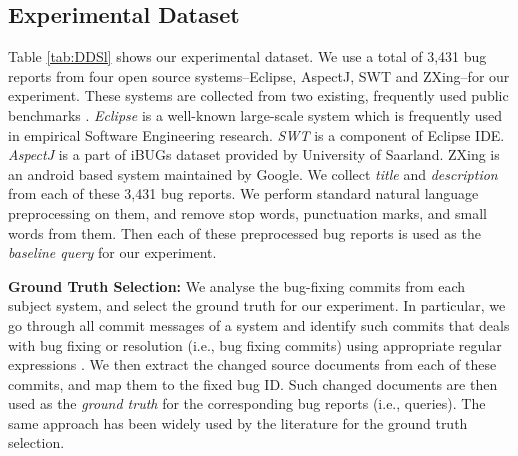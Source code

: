 \documentclass[sigconf,review,anonymous]{acmart}
\begin{document}
\subsection{Experimental Dataset}\label{sec:dataset}
Table \ref{tab:DDSl} shows our experimental dataset. We use a total of 3,431 bug reports from four open source systems--Eclipse, AspectJ, SWT and ZXing--for our experiment. These systems are collected from two existing, frequently used public benchmarks \cite{Jian,Saha}. 
\emph{Eclipse} is a well-known large-scale system which is frequently used in empirical Software Engineering research.
\emph{SWT} is a component of Eclipse IDE.
\emph{AspectJ} is a part of iBUGs dataset provided by University of Saarland. 
ZXing is an android based system maintained by Google. We collect \emph{title} and \emph{description} from each of these 3,431 bug reports. We perform standard natural language preprocessing on them, and remove stop words, punctuation marks, and small words from them. Then each of these preprocessed bug reports is used as the \emph{baseline query} for our experiment. 



\textbf{Ground Truth Selection:} We analyse the bug-fixing commits from each subject system, and select the ground truth for our experiment. In particular, we go through all commit messages of a system and identify such commits that deals with bug fixing or resolution (i.e., bug fixing commits) using appropriate regular expressions \cite{bugid}. We then extract the changed source documents from each of these commits, and map them to the fixed bug ID. Such changed documents are then used as the \emph{ground truth} for the corresponding bug reports (i.e., queries). The same approach has been widely used by the literature \cite{Saha2,Wang2,Jian} for the ground truth selection. 

\end{document}

